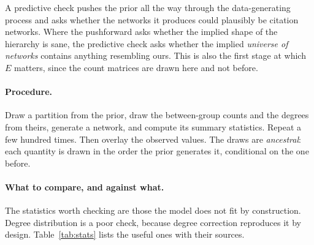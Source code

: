 \documentclass[11pt]{article}
\begin{document}
A predictive check pushes the prior all the way through the data-generating
process and asks whether the networks it produces could plausibly be citation
networks. Where the pushforward asks whether the implied shape of the
hierarchy is sane, the predictive check asks whether the implied
\emph{universe of networks} contains anything resembling ours. This is also
the first stage at which $E$ matters, since the count matrices are drawn
here and not before.

\paragraph{Procedure.} Draw a partition from the prior, draw the between-group
counts and the degrees from theirs, generate a network, and compute its
summary statistics. Repeat a few hundred times. Then overlay the observed
values. The draws are \emph{ancestral}: each quantity is drawn in the order the
prior generates it, conditional on the one before.

\paragraph{What to compare, and against what.} The statistics worth checking are
those the model does not fit by construction. Degree distribution is a poor
check, because degree correction reproduces it by design. Table~\ref{tab:stats}
lists the useful ones with their sources.
\end{document}
